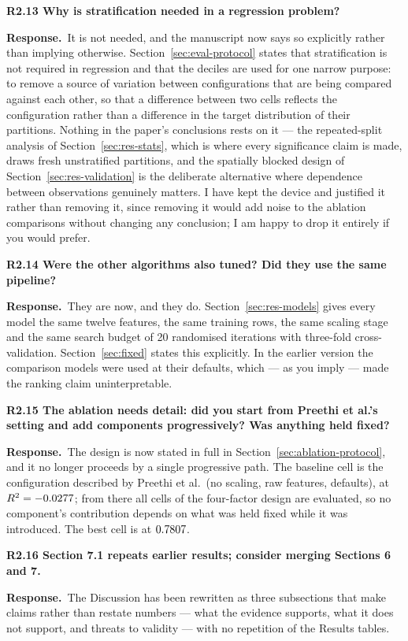 \documentclass[11pt,a4paper]{article}
\newcommand{\reply}{\par\noindent\textbf{Response.}\ }
\newcommand{\pt}[1]{\par\medskip\noindent\textbf{#1}\par}
\begin{document}
\pt{R2.13 Why is stratification needed in a regression problem?}
\reply It is not needed, and the manuscript now says so explicitly rather than implying
otherwise. Section~\ref{sec:eval-protocol} states that stratification is not required in
regression and that the deciles are used for one narrow purpose: to remove a source of
variation between configurations that are being compared against each other, so that a
difference between two cells reflects the configuration rather than a difference in the
target distribution of their partitions. Nothing in the paper's conclusions rests on it ---
the repeated-split analysis of Section~\ref{sec:res-stats}, which is where every significance
claim is made, draws fresh unstratified partitions, and the spatially blocked design of
Section~\ref{sec:res-validation} is the deliberate alternative where dependence between
observations genuinely matters. I have kept the device and justified it rather than removing
it, since removing it would add noise to the ablation comparisons without changing any
conclusion; I am happy to drop it entirely if you would prefer.

\pt{R2.14 Were the other algorithms also tuned? Did they use the same pipeline?}
\reply They are now, and they do. Section~\ref{sec:res-models} gives every model the same twelve features,
the same training rows, the same scaling stage and the same search budget of 20 randomised
iterations with three-fold cross-validation. Section~\ref{sec:fixed} states this explicitly. In the
earlier version the comparison models were used at their defaults, which --- as you imply ---
made the ranking claim uninterpretable.

\pt{R2.15 The ablation needs detail: did you start from Preethi et al.'s setting and add
components progressively? Was anything held fixed?}
\reply The design is now stated in full in Section~\ref{sec:ablation-protocol}, and it no longer proceeds by a single
progressive path. The baseline cell is the configuration described by Preethi et al.\ (no
scaling, raw features, defaults), at $R^2 = -0.0277$; from there all \AblNcells{} cells
of the four-factor design are evaluated, so no component's contribution depends on what was
held fixed while it was introduced. The best cell is \AblBestCell{} at $0.7807$.

\pt{R2.16 Section 7.1 repeats earlier results; consider merging Sections 6 and 7.}
\reply The Discussion has been rewritten as three subsections that make claims rather than
restate numbers --- what the evidence supports, what it does not support, and threats to
validity --- with no repetition of the Results tables.
\end{document}
